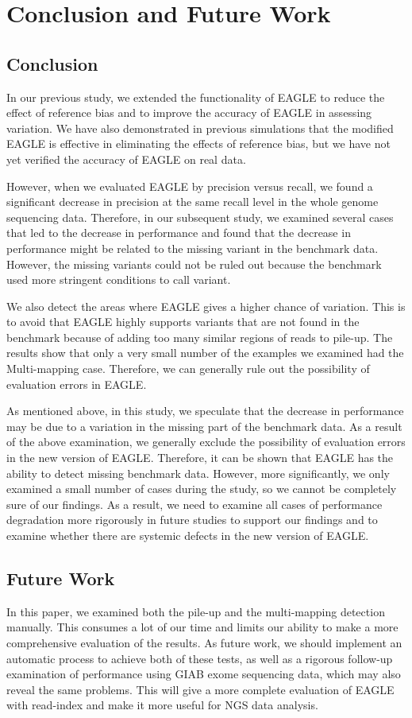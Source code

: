 \documentclass[PhD]{PHlab-thesis}
\begin{document}
\chapter{Conclusion and Future Work}
\section{Conclusion}
In our previous study, we extended the functionality of EAGLE to reduce the effect of reference bias and to improve the accuracy of EAGLE in assessing variation. We have also demonstrated in previous simulations that the modified EAGLE is effective in eliminating the effects of reference bias, but we have not yet verified the accuracy of EAGLE on real data.

However, when we evaluated EAGLE by precision versus recall, we found a significant decrease in precision at the same recall level in the whole genome sequencing data. Therefore, in our subsequent study, we examined several cases that led to the decrease in performance and found that the decrease in performance might be related to the missing variant in the benchmark data. However, the missing variants could not be ruled out because the benchmark used more stringent conditions to call variant.

We also detect the areas where EAGLE gives a higher chance of variation. This is to avoid that EAGLE highly supports variants that are not found in the benchmark because of adding too many similar regions of reads to pile-up. The results show that only a very small number of the examples we examined had the Multi-mapping case. Therefore, we can generally rule out the possibility of evaluation errors in EAGLE.

As mentioned above, in this study, we speculate that the decrease in performance may be due to a variation in the missing part of the benchmark data. As a result of the above examination, we generally exclude the possibility of evaluation errors in the new version of EAGLE. Therefore, it can be shown that EAGLE has the ability to detect missing benchmark data. However, more significantly, we only examined a small number of cases during the study, so we cannot be completely sure of our findings. As a result, we need to examine all cases of performance degradation more rigorously in future studies to support our findings and to examine whether there are systemic defects in the new version of EAGLE.
\section{Future Work}
In this paper, we examined both the pile-up and the multi-mapping detection manually. This consumes a lot of our time and limits our ability to make a more comprehensive evaluation of the results. As future work, we should implement an automatic process to achieve both of these tests, as well as a rigorous follow-up examination of performance using GIAB exome sequencing data, which may also reveal the same problems. This will give a more complete evaluation of EAGLE with read-index and make it more useful for NGS data analysis.

\newpage
{}
\printbibliography
\end{document}
